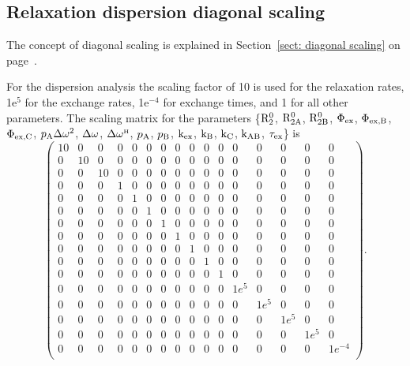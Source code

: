 \subsection{Relaxation dispersion diagonal scaling}

The concept of diagonal scaling is explained in Section~\ref{sect: diagonal scaling} on page~\pageref{sect: diagonal scaling}.

For the dispersion analysis the scaling factor of 10 is used for the relaxation rates, 1e$^5$ for the exchange rates, 1e$^{-4}$ for exchange times, and 1 for all other parameters.
The scaling matrix for the parameters \{$\mathrm{R}_2^0$, $\mathrm{R}_\mathrm{2A}^0$, $\mathrm{R}_\mathrm{2B}^0$, $\Phi_\textrm{ex}$, $\Phi_\textrm{ex,B}$, $\Phi_\textrm{ex,C}$, $p_\textrm{A}\Delta\omega^2$, $\Delta\omega$, $\Delta\omega^{\scriptscriptstyle\mathrm{H}}$, $p_\textrm{A}$, $p_\textrm{B}$, $\textrm{k}_\textrm{ex}$, $\textrm{k}_\textrm{B}$, $\textrm{k}_\textrm{C}$, $\textrm{k}_\textrm{AB}$, $\tau_\textrm{ex}$\} is
\begin{equation}
    \begin{pmatrix}
        10 & 0  & 0  & 0 & 0 & 0 & 0 & 0 & 0 & 0 & 0 & 0    & 0    & 0    & 0    & 0       \\
        0  & 10 & 0  & 0 & 0 & 0 & 0 & 0 & 0 & 0 & 0 & 0    & 0    & 0    & 0    & 0       \\
        0  & 0  & 10 & 0 & 0 & 0 & 0 & 0 & 0 & 0 & 0 & 0    & 0    & 0    & 0    & 0       \\
        0  & 0  & 0  & 1 & 0 & 0 & 0 & 0 & 0 & 0 & 0 & 0    & 0    & 0    & 0    & 0       \\
        0  & 0  & 0  & 0 & 1 & 0 & 0 & 0 & 0 & 0 & 0 & 0    & 0    & 0    & 0    & 0       \\
        0  & 0  & 0  & 0 & 0 & 1 & 0 & 0 & 0 & 0 & 0 & 0    & 0    & 0    & 0    & 0       \\
        0  & 0  & 0  & 0 & 0 & 0 & 1 & 0 & 0 & 0 & 0 & 0    & 0    & 0    & 0    & 0       \\
        0  & 0  & 0  & 0 & 0 & 0 & 0 & 1 & 0 & 0 & 0 & 0    & 0    & 0    & 0    & 0       \\
        0  & 0  & 0  & 0 & 0 & 0 & 0 & 0 & 1 & 0 & 0 & 0    & 0    & 0    & 0    & 0       \\
        0  & 0  & 0  & 0 & 0 & 0 & 0 & 0 & 0 & 1 & 0 & 0    & 0    & 0    & 0    & 0       \\
        0  & 0  & 0  & 0 & 0 & 0 & 0 & 0 & 0 & 0 & 1 & 0    & 0    & 0    & 0    & 0       \\
        0  & 0  & 0  & 0 & 0 & 0 & 0 & 0 & 0 & 0 & 0 & 1e^5 & 0    & 0    & 0    & 0       \\
        0  & 0  & 0  & 0 & 0 & 0 & 0 & 0 & 0 & 0 & 0 & 0    & 1e^5 & 0    & 0    & 0       \\
        0  & 0  & 0  & 0 & 0 & 0 & 0 & 0 & 0 & 0 & 0 & 0    & 0    & 1e^5 & 0    & 0       \\
        0  & 0  & 0  & 0 & 0 & 0 & 0 & 0 & 0 & 0 & 0 & 0    & 0    & 0    & 1e^5 & 0       \\
        0  & 0  & 0  & 0 & 0 & 0 & 0 & 0 & 0 & 0 & 0 & 0    & 0    & 0    & 0    & 1e^{-4} \\
    \end{pmatrix}.
\end{equation}


